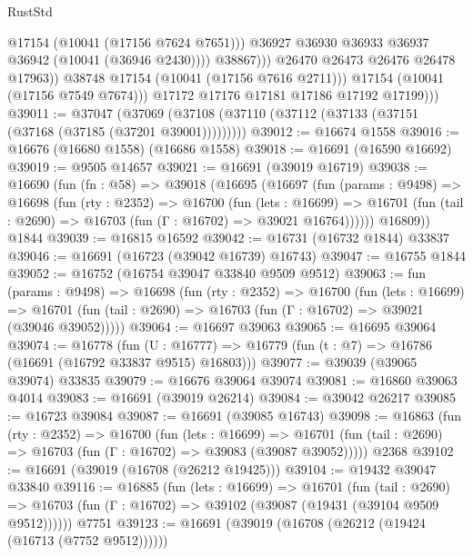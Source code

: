 \begin{lexlean}{RustStd}
\begin{coremodule}
                              @17154
                              (@10041 (@17156 @7624 @7651)))
                            @36927
                            @36930
                            @36933
                            @36937
                            @36942
                            (@10041 (@36946 @2430))))
                        @38867)))
                  @26470
                  @26473
                  @26476
                  @26478
                  @17963))
              @38748
              @17154
              (@10041 (@17156 @7616 @2711)))
            @17154
            (@10041 (@17156 @7549 @7674)))
          @17172
          @17176
          @17181
          @17186
          @17192
          @17199)))
@39011 := @37047
    (@37069 (@37108 (@37110 (@37112 (@37133 (@37151 (@37168 (@37185 (@37201 @39001)))))))))
@39012 := @16674 @1558
@39016 := @16676 (@16680 @1558) (@16686 @1558)
@39018 := @16691 (@16590 @16692)
@39019 := @9505 @14657
@39021 := @16691 (@39019 @16719)
@39038 := @16690
    (fun (fn : @58) =>
    @39018
      (@16695
        (@16697
          (fun (params : @9498) =>
          @16698
            (fun (rty : @2352) =>
            @16700
              (fun (lets : @16699) =>
              @16701 (fun (tail : @2690) => @16703 (fun (Γ : @16702) => @39021 @16764))))))
        @16809))
    @1844
@39039 := @16815 @16592
@39042 := @16731 (@16732 @1844) @33837
@39046 := @16691 (@16723 (@39042 @16739) @16743)
@39047 := @16755 @1844
@39052 := @16752 (@16754 @39047 @33840 @9509 @9512)
@39063 := fun (params : @9498) =>
  @16698
    (fun (rty : @2352) =>
    @16700
      (fun (lets : @16699) =>
      @16701 (fun (tail : @2690) => @16703 (fun (Γ : @16702) => @39021 (@39046 @39052)))))
@39064 := @16697 @39063
@39065 := @16695 @39064
@39074 := @16778
    (fun (U : @16777) => @16779 (fun (t : @7) => @16786 (@16691 (@16792 @33837 @9515) @16803)))
@39077 := @39039 (@39065 @39074) @33835
@39079 := @16676 @39064 @39074
@39081 := @16860 @39063 @4014
@39083 := @16691 (@39019 @26214)
@39084 := @39042 @26217
@39085 := @16723 @39084
@39087 := @16691 (@39085 @16743)
@39098 := @16863
    (fun (rty : @2352) =>
    @16700
      (fun (lets : @16699) =>
      @16701 (fun (tail : @2690) => @16703 (fun (Γ : @16702) => @39083 (@39087 @39052)))))
    @2368
@39102 := @16691 (@39019 (@16708 (@26212 @19425)))
@39104 := @19432 @39047 @33840
@39116 := @16885
    (fun (lets : @16699) =>
    @16701
      (fun (tail : @2690) =>
      @16703 (fun (Γ : @16702) => @39102 (@39087 (@19431 (@39104 @9509 @9512))))))
    @7751
@39123 := @16691 (@39019 (@16708 (@26212 (@19424 (@16713 (@7752 @9512))))))

\end{coremodule}
\end{lexlean}
